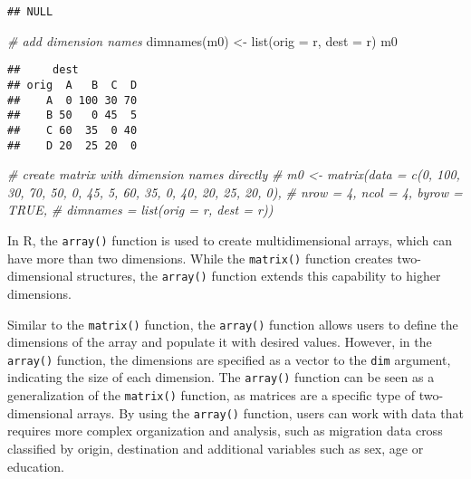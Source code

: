 \documentclass[
]{book}
\newenvironment{Shaded}{\begin{snugshade}}{\end{snugshade}}
\newcommand{\AttributeTok}[1]{\textcolor[rgb]{0.77,0.63,0.00}{#1}}
\newcommand{\CommentTok}[1]{\textcolor[rgb]{0.56,0.35,0.01}{\textit{#1}}}
\newcommand{\FunctionTok}[1]{\textcolor[rgb]{0.00,0.00,0.00}{#1}}
\newcommand{\NormalTok}[1]{#1}
\newcommand{\OtherTok}[1]{\textcolor[rgb]{0.56,0.35,0.01}{#1}}
\begin{document}
\begin{verbatim}
## NULL
\end{verbatim}

\begin{Shaded}
\begin{Highlighting}[]
\CommentTok{\# add dimension names}
\FunctionTok{dimnames}\NormalTok{(m0) }\OtherTok{\textless{}{-}} \FunctionTok{list}\NormalTok{(}\AttributeTok{orig =}\NormalTok{ r, }\AttributeTok{dest =}\NormalTok{ r)}
\NormalTok{m0}
\end{Highlighting}
\end{Shaded}

\begin{verbatim}
##     dest
## orig  A   B  C  D
##    A  0 100 30 70
##    B 50   0 45  5
##    C 60  35  0 40
##    D 20  25 20  0
\end{verbatim}

\begin{Shaded}
\begin{Highlighting}[]
\CommentTok{\# create matrix with dimension names directly}
\CommentTok{\# m0 \textless{}{-} matrix(data = c(0, 100, 30, 70, 50, 0, 45, 5, 60, 35, 0, 40, 20, 25, 20, 0),}
\CommentTok{\#              nrow = 4, ncol = 4, byrow = TRUE,}
\CommentTok{\#              dimnames = list(orig = r, dest = r))}
\end{Highlighting}
\end{Shaded}

In R, the \texttt{array()} function is used to create multidimensional arrays, which can have more than two dimensions. While the \texttt{matrix()} function creates two-dimensional structures, the \texttt{array()} function extends this capability to higher dimensions.

Similar to the \texttt{matrix()} function, the \texttt{array()} function allows users to define the dimensions of the array and populate it with desired values. However, in the \texttt{array()} function, the dimensions are specified as a vector to the \texttt{dim} argument, indicating the size of each dimension.
The \texttt{array()} function can be seen as a generalization of the \texttt{matrix()} function, as matrices are a specific type of two-dimensional arrays. By using the \texttt{array()} function, users can work with data that requires more complex organization and analysis, such as migration data cross classified by origin, destination and additional variables such as sex, age or education.
\end{document}
